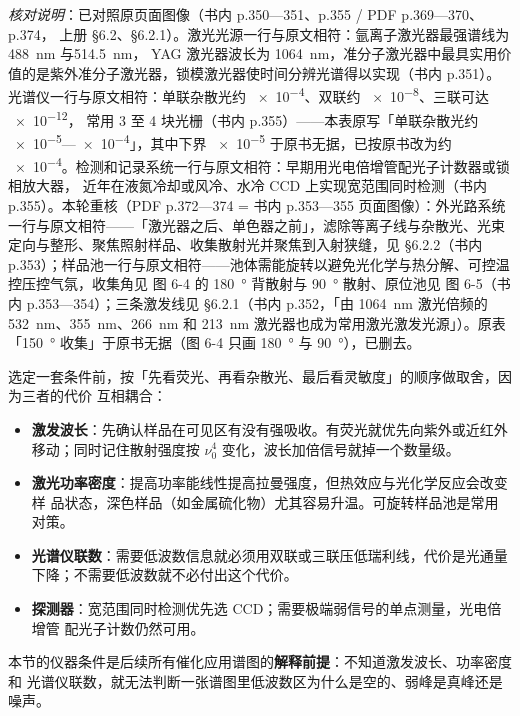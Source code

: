 \emph{核对说明}：已对照原页面图像（书内 p.350—351、p.355 / PDF p.369—370、p.374，
上册 §6.2、§6.2.1）。激光光源一行与原文相符：氩离子激光器最强谱线为 \qty{488}{nm} 与\qty{514.5}{nm}，
YAG 激光器波长为 \qty{1064}{nm}，准分子激光器中最具实用价值的是紫外准分子激光器，锁模激光器使时间分辨光谱得以实现（书内
p.351）。光谱仪一行与原文相符：单联杂散光约 \num{e-4}、双联约 \num{e-8}、三联可达 \num{e-12}，
常用 3 至 4 块光栅（书内 p.355）——本表原写「单联杂散光约 \num{e-5}—\num{e-4}」，其中下界
\num{e-5} 于原书无据，已按原书改为约 \num{e-4}。检测和记录系统一行与原文相符：早期用光电倍增管配光子计数器或锁相放大器，
近年在液氮冷却或风冷、水冷 CCD 上实现宽范围同时检测（书内 p.355）。本轮重核（PDF p.372—374 = 书内 p.353—355 页面图像）：外光路系统一行与原文相符——「激光器之后、单色器之前」，滤除等离子线与杂散光、光束定向与整形、聚焦照射样品、收集散射光并聚焦到入射狭缝，见 §6.2.2（书内 p.353）；样品池一行与原文相符——池体需能旋转以避免光化学与热分解、可控温控压控气氛，收集角见 图 6-4 的 \qty{180}{\degree} 背散射与 \qty{90}{\degree} 散射、原位池见 图 6-5（书内 p.353—354）；三条激发线见 §6.2.1（书内 p.352，「由 \qty{1064}{nm} 激光倍频的 \qty{532}{nm}、\qty{355}{nm}、\qty{266}{nm} 和 \qty{213}{nm} 激光器也成为常用激光激发光源」）。原表「\qty{150}{\degree} 收集」于原书无据（图 6-4 只画 \qty{180}{\degree} 与 \qty{90}{\degree}），已删去。


\begin{measure}
选定一套条件前，按「先看荧光、再看杂散光、最后看灵敏度」的顺序做取舍，因为三者的代价
互相耦合：
\begin{itemize}
\item \textbf{激发波长}：先确认样品在可见区有没有强吸收。有荧光就优先向紫外或近红外
  移动；同时记住散射强度按 $\nu_0^4$ 变化，波长加倍信号就掉一个数量级。
\item \textbf{激光功率密度}：提高功率能线性提高拉曼强度，但热效应与光化学反应会改变样
  品状态，深色样品（如金属硫化物）尤其容易升温。可旋转样品池是常用对策。
\item \textbf{光谱仪联数}：需要低波数信息就必须用双联或三联压低瑞利线，代价是光通量
  下降；不需要低波数就不必付出这个代价。
\item \textbf{探测器}：宽范围同时检测优先选 CCD；需要极端弱信号的单点测量，光电倍增管
  配光子计数仍然可用。
\end{itemize}
本节的仪器条件是后续所有催化应用谱图的\textbf{解释前提}：不知道激发波长、功率密度和
光谱仪联数，就无法判断一张谱图里低波数区为什么是空的、弱峰是真峰还是噪声。
\end{measure}

